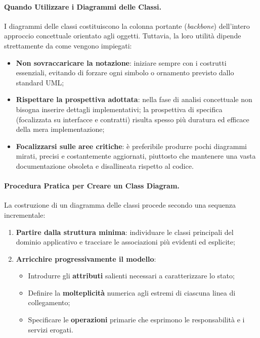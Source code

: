 \documentclass[12pt]{extarticle}
\begin{document}
\paragraph{Quando Utilizzare i Diagrammi delle Classi.}
I diagrammi delle classi costituiscono la colonna portante (\textit{backbone}) dell'intero approccio concettuale orientato agli oggetti. Tuttavia, la loro utilit\`a dipende strettamente da come vengono impiegati:
\begin{itemize}
    \item \textbf{Non sovraccaricare la notazione}: iniziare sempre con i costrutti essenziali, evitando di forzare ogni simbolo o ornamento previsto dallo standard UML;
    \item \textbf{Rispettare la prospettiva adottata}: nella fase di analisi concettuale non bisogna inserire dettagli implementativi; la prospettiva di specifica (focalizzata su interfacce e contratti) risulta spesso pi\`u duratura ed efficace della mera implementazione;
    \item \textbf{Focalizzarsi sulle aree critiche}: \`e preferibile produrre pochi diagrammi mirati, precisi e costantemente aggiornati, piuttosto che mantenere una vasta documentazione obsoleta e disallineata rispetto al codice.
\end{itemize}

\paragraph{Procedura Pratica per Creare un Class Diagram.}
La costruzione di un diagramma delle classi procede secondo una sequenza incrementale:
\begin{enumerate}
    \item \textbf{Partire dalla struttura minima}: individuare le classi principali del dominio applicativo e tracciare le associazioni pi\`u evidenti ed esplicite;
    \item \textbf{Arricchire progressivamente il modello}:
    \begin{itemize}
        \item Introdurre gli \textbf{attributi} salienti necessari a caratterizzare lo stato;
        \item Definire la \textbf{molteplicit\`a} numerica agli estremi di ciascuna linea di collegamento;
        \item Specificare le \textbf{operazioni} primarie che esprimono le responsabilit\`a e i servizi erogati.
    \end{itemize}
\end{enumerate}
\end{document}
